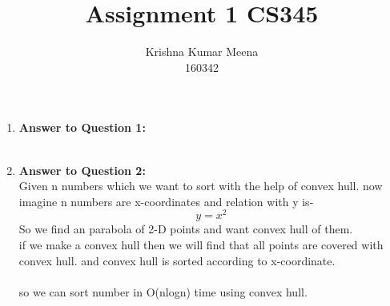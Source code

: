 \documentclass[11pt]{article}
\begin{document}
\author{Krishna Kumar Meena \\ 160342}
\title{Assignment 1 CS345 }
\maketitle

\medskip

\begin{enumerate}
\item \textbf{Answer to Question 1:}\\
\\ 
\item \textbf{Answer to Question 2:}\\

Given n numbers which we want to sort with the help of convex hull.
now imagine n numbers are x-coordinates and relation with y is-
\begin{equation}
    y=x^2
\end{equation}
So we find an parabola of 2-D points and want convex hull of them.\\
if we make a convex hull then we will find that all points are covered with convex hull. and convex hull is sorted according  to x-coordinate.\\ \\
so we can sort number in O(nlogn) time using convex hull.


\end{enumerate}
\end{document}
